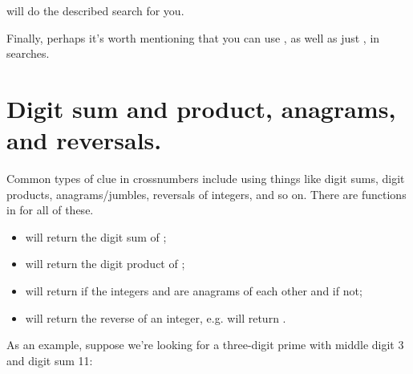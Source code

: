 \documentclass[letterpaper,10pt,english]{sphinxmanual}
\begin{document}
will do the described search for you.

Finally, perhaps it’s worth mentioning that you can use , as well as just , in searches.


\section{Digit sum and product, anagrams, and reversals.}
\label{\detokenize{index:digit-sum-and-product-anagrams-and-reversals}}
Common types of clue in crossnumbers include using things like digit sums, digit products, anagrams/jumbles, reversals of integers, and so on. There are functions in  for all of these.
\begin{itemize}
\item {} 
 will return the digit sum of ;

\item {} 
 will return the digit product of ;

\item {} 
 will return  if the integers  and  are anagrams of each other and  if not;

\item {} 
 will return the reverse of an integer, e.g.  will return .

\end{itemize}

As an example, suppose we’re looking for a three-digit prime with middle digit 3 and digit sum 11:

\begin{sphinxVerbatim}[commandchars=\\\{\}]
   
      
\end{sphinxVerbatim}
\end{document}
